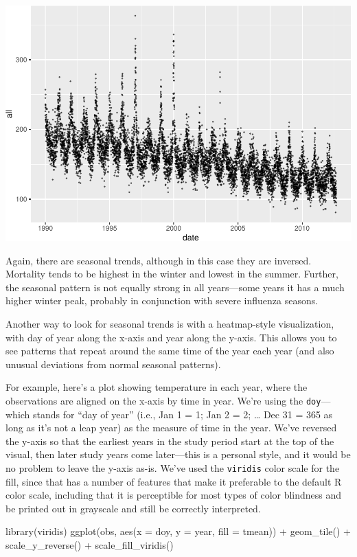 \documentclass[
]{book}
\newenvironment{Shaded}{\begin{snugshade}}{\end{snugshade}}
\newcommand{\AttributeTok}[1]{\textcolor[rgb]{0.77,0.63,0.00}{#1}}
\newcommand{\FunctionTok}[1]{\textcolor[rgb]{0.00,0.00,0.00}{#1}}
\newcommand{\NormalTok}[1]{#1}
\newcommand{\SpecialCharTok}[1]{\textcolor[rgb]{0.00,0.00,0.00}{#1}}
\begin{document}
\includegraphics{adv_epi_analysis_files/figure-latex/unnamed-chunk-11-1.pdf}

Again, there are seasonal trends, although in this case they are inversed.
Mortality tends to be highest in the winter and lowest in the summer. Further, the
seasonal pattern is not equally strong in all years---some years it has a much
higher winter peak, probably in conjunction with severe influenza seasons.

Another way to look for seasonal trends is with a heatmap-style visualization,
with day of year along the x-axis and year along the y-axis. This allows you
to see patterns that repeat around the same time of the year each year (and
also unusual deviations from normal seasonal patterns).

For example, here's a plot showing temperature in each year, where the
observations are aligned on the x-axis by time in year. We're using the \texttt{doy}---which stands for ``day of year'' (i.e., Jan 1 = 1; Jan 2 = 2; \ldots{} Dec 31 = 365 as long
as it's not a leap year) as the measure of time in the year. We've reversed
the y-axis so that the earliest years in the study period start at the top
of the visual, then later study years come later---this is a personal style,
and it would be no problem to leave the y-axis as-is. We've used the
\texttt{viridis} color scale for the fill, since that has a number of features
that make it preferable to the default R color scale, including that it
is perceptible for most types of color blindness and be printed out in grayscale
and still be correctly interpreted.

\begin{Shaded}
\begin{Highlighting}[]
\FunctionTok{library}\NormalTok{(viridis)}
\FunctionTok{ggplot}\NormalTok{(obs, }\FunctionTok{aes}\NormalTok{(}\AttributeTok{x =}\NormalTok{ doy, }\AttributeTok{y =}\NormalTok{ year, }\AttributeTok{fill =}\NormalTok{ tmean)) }\SpecialCharTok{+} 
  \FunctionTok{geom\_tile}\NormalTok{() }\SpecialCharTok{+}
  \FunctionTok{scale\_y\_reverse}\NormalTok{() }\SpecialCharTok{+} 
  \FunctionTok{scale\_fill\_viridis}\NormalTok{()}
\end{Highlighting}
\end{Shaded}
\end{document}
